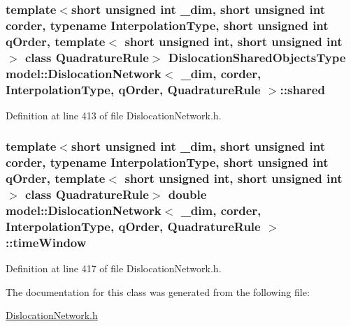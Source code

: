 \hypertarget{classmodel_1_1_dislocation_network_aa4a706dc3b9e19527c01c7e4ecc9c002}{}
\subsubsection[{shared}]{\setlength{\rightskip}{0pt plus 5cm}template$<$short unsigned int \+\_\+dim, short unsigned int corder, typename Interpolation\+Type, short unsigned int q\+Order, template$<$ short unsigned int, short unsigned int $>$ class Quadrature\+Rule$>$ {\bf Dislocation\+Shared\+Objects\+Type} {\bf model\+::\+Dislocation\+Network}$<$ \+\_\+dim, corder, Interpolation\+Type, q\+Order, Quadrature\+Rule $>$\+::shared}\label{classmodel_1_1_dislocation_network_aa4a706dc3b9e19527c01c7e4ecc9c002}


Definition at line 413 of file Dislocation\+Network.\+h.

\hypertarget{classmodel_1_1_dislocation_network_a33bf4f39364d860561c7e507a4dabb0c}{}
\subsubsection[{time\+Window}]{\setlength{\rightskip}{0pt plus 5cm}template$<$short unsigned int \+\_\+dim, short unsigned int corder, typename Interpolation\+Type, short unsigned int q\+Order, template$<$ short unsigned int, short unsigned int $>$ class Quadrature\+Rule$>$ double {\bf model\+::\+Dislocation\+Network}$<$ \+\_\+dim, corder, Interpolation\+Type, q\+Order, Quadrature\+Rule $>$\+::time\+Window}\label{classmodel_1_1_dislocation_network_a33bf4f39364d860561c7e507a4dabb0c}


Definition at line 417 of file Dislocation\+Network.\+h.



The documentation for this class was generated from the following file\+:\begin{DoxyCompactItemize}
\item 
\hyperlink{_dislocation_network_8h}{Dislocation\+Network.\+h}\end{DoxyCompactItemize}
